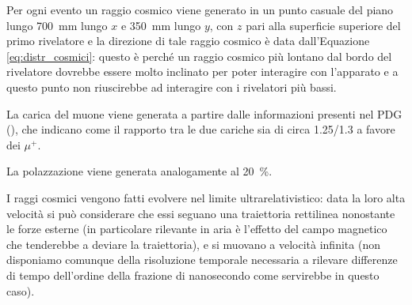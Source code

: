 Per ogni evento un raggio cosmico viene generato in un punto casuale del piano lungo \SI{700}{\mm} lungo $x$ e \SI{350}{\mm} lungo $y$, con $z$ pari alla superficie superiore del primo rivelatore e la direzione di tale raggio cosmico è data dall'Equazione \ref{eq:distr_cosmici}: questo \`e perch\'e un raggio cosmico pi\`u lontano dal bordo del rivelatore dovrebbe essere molto inclinato per poter interagire con l'apparato e a questo punto non riuscirebbe ad interagire con i rivelatori pi\`u bassi.

La carica del muone viene generata a partire dalle informazioni presenti nel PDG (\cite{bib:Patrignani:2016xqp}), che indicano come il rapporto tra le due cariche sia di circa 1.25/1.3 a favore dei $\mu^+$.

La polazzazione viene generata analogamente al \SI{20}{\percent}.

I raggi cosmici vengono fatti evolvere nel limite ultrarelativistico: data la loro alta velocità si può considerare che essi seguano una traiettoria rettilinea nonostante
le forze esterne (in particolare rilevante in aria è l'effetto del campo magnetico che tenderebbe a deviare la traiettoria), e si muovano a velocità infinita (non disponiamo comunque della risoluzione temporale necessaria a rilevare differenze di tempo dell'ordine della frazione di nanosecondo come servirebbe in questo caso).

